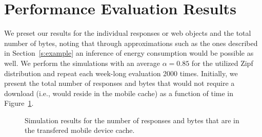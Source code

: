 \documentclass[letterpaper,conference]{IEEEtran}
\begin{document}
\section{Performance Evaluation Results}
\label{s:results}
We preset our results for the individual responses or web objects and the total number of bytes, noting that through approximations such as the ones described in Section~\ref{s:example} an inference of energy consumption would be possible as well.
We perform the simulations with an average $\alpha=0.85$ for the utilized Zipf distribution and repeat each week-long evaluation 2000 times.
Initially, we present the total number of responses and bytes that would not require a download (i.e., would reside in the mobile cache) as a function of time in Figure~\ref{fig:sim1}.
\begin{figure}[]
	\centering
	\hfil
	\caption{Simulation results for the number of responses and bytes that are in the transfered mobile device cache.}
	\label{fig:sim1}
\end{figure}
\end{document}
